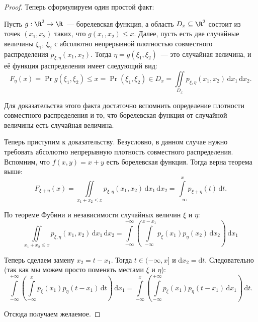 \begin{proof}
	Теперь сформулируем один простой факт:
	\begin{theorem}
		Пусть \(g : \R^2 \to \R\)~--- борелевская функция, а область \(D_x \subseteq \R^2\) состоит из точек \((x_1, x_2)\) таких, что \(g(x_1, x_2) \leq x\). Далее, пусть есть две случайные величины \(\xi_1\), \(\xi_2\) с абсолютно непрерывной плотностью совместного распределения \(p_{\xi, \eta}(x_1, x_2)\). Тогда \(\eta = g(\xi_1, \xi_2)\)~--- это случайная величина, и её функция распределения имеет следующий вид:
		\[F_{\eta}(x) = \Pr{g(\xi_1, \xi_2) \leq x} = \Pr{(\xi_1, \xi_2) \in D_x} = \iint\limits_{D_x} p_{\xi, \eta}(x_1, x_2)\,\mathrm{d}x_1\,\mathrm{d}x_2.\]
	\end{theorem}
	Для доказательства этого факта достаточно вспомнить определение плотности совместного распределения и то, что борелевская функция от случайной величины есть случайная величина.	
	
	Теперь приступим к доказательству. Безусловно, в данном случае нужно требовать абсолютно непрерывную плотность совместного распределения. Вспомним, что \(f(x, y) = x + y\) есть борелевская функция. Тогда верна теорема выше:
	\[
	F_{\xi + \eta}(x) = \iint\limits_{x_1 + x_2 \leq x} p_{\xi, \eta}(x_1, x_2)\,\mathrm{d}x_1\,\mathrm{d}x_2 = \int\limits_{-\infty}^{x} p_{\xi + \eta}(t)\,\mathrm{d}t.
	\]
	
	По теореме Фубини и независимости случайных величин \(\xi\) и \(\eta\):
	\[\iint\limits_{x_1 + x_2 \leq x} p_{\xi, \eta}(x_1, x_2)\,\mathrm{d}x_1\,\mathrm{d}x_2 = \int\limits_{-\infty}^{+\infty} \left( \int\limits_{-\infty}^{x - x_1} p_{\xi}(x_1) p_{\eta}(x_2)\,\mathrm{d}x_2 \right)\,\mathrm{d}x_1\]
	
	Теперь сделаем замену \(x_2 = t - x_1\). Тогда \(t \in (-\infty, x]\) и \(\mathrm{d}x_2 = \mathrm{d}t\). Следовательно (так как мы можем просто поменять местами \(\xi\) и \(\eta\)):
	\[\int\limits_{-\infty}^{+\infty} \left( \int\limits_{-\infty}^{x} p_{\xi}(x_1) p_{\eta}(t - x_1)\,\mathrm{d}t \right)\,\mathrm{d}x_1 = \int\limits_{-\infty}^{x} \left( \int\limits_{-\infty}^{+\infty} p_{\xi}(x_1) p_{\eta}(t - x_1)\,\mathrm{d}x_1 \right)\,\mathrm{d}t.\]
	
	Отсюда получаем желаемое.
\end{proof}

